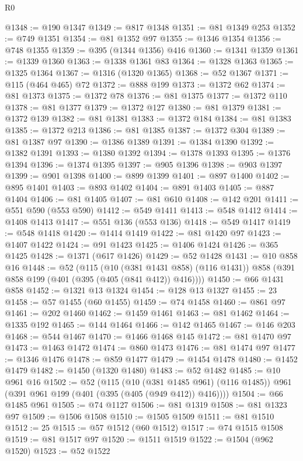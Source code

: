 \begin{lexlean}{R0}
\begin{coremodule}
@1348 := @190 @1347
@1349 := @817 @1348
@1351 := @81 @1349 @253
@1352 := @749 @1351
@1354 := @81 @1352 @97
@1355 := @1346 @1354
@1356 := @748 @1355
@1359 := @395 (@1344 @1356) @416
@1360 := @1341 @1359
@1361 := @1339 @1360
@1363 := @1338 @1361 @83
@1364 := @1328 @1363
@1365 := @1325 @1364
@1367 := @1316 (@1320 @1365)
@1368 := @52 @1367
@1371 := @115 (@464 @465) @72
@1372 := @888 @199
@1373 := @1372 @62
@1374 := @81 @1373
@1375 := @1372 @78
@1376 := @81 @1375
@1377 := @1372 @110
@1378 := @81 @1377
@1379 := @1372 @127
@1380 := @81 @1379
@1381 := @1372 @139
@1382 := @81 @1381
@1383 := @1372 @184
@1384 := @81 @1383
@1385 := @1372 @213
@1386 := @81 @1385
@1387 := @1372 @304
@1389 := @81 @1387 @97
@1390 := @1386 @1389
@1391 := @1384 @1390
@1392 := @1382 @1391
@1393 := @1380 @1392
@1394 := @1378 @1393
@1395 := @1376 @1394
@1396 := @1374 @1395
@1397 := @905 @1396
@1398 := @903 @1397
@1399 := @901 @1398
@1400 := @899 @1399
@1401 := @897 @1400
@1402 := @895 @1401
@1403 := @893 @1402
@1404 := @891 @1403
@1405 := @887 @1404
@1406 := @81 @1405
@1407 := @81 @610
@1408 := @142 @201
@1411 := @551 @590 (@553 @590)
@1412 := @549 @1411
@1413 := @548 @1412
@1414 := @1408 @1413
@1417 := @551 @136 (@553 @136)
@1418 := @549 @1417
@1419 := @548 @1418
@1420 := @1414 @1419
@1422 := @81 @1420 @97
@1423 := @1407 @1422
@1424 := @91 @1423
@1425 := @1406 @1424
@1426 := @365 @1425
@1428 := @1371 (@617 @1426)
@1429 := @52 @1428
@1431 := @10 @858 @16
@1448 := @52
    (@115
      (@10 (@381 @1431 @858) (@116 @1431))
      @858
      (@391 @858 @199 (@401 (@395 (@405 (@841 @412)) @416))))
@1450 := @66 @1431 @858
@1452 := @1321 @13 @1324
@1454 := @128 @13 @1327
@1455 := 23
@1458 := @57 @1455 (@60 @1455)
@1459 := @74 @1458
@1460 := @861 @97
@1461 := @202 @1460
@1462 := @1459 @1461
@1463 := @81 @1462
@1464 := @1335 @192
@1465 := @144 @1464
@1466 := @142 @1465
@1467 := @146 @203
@1468 := @544 @1467
@1470 := @1466 @1468 @145
@1472 := @81 @1470 @97
@1473 := @1463 @1472
@1474 := @860 @1473
@1476 := @81 @1474 @97
@1477 := @1346 @1476
@1478 := @859 @1477
@1479 := @1454 @1478
@1480 := @1452 @1479
@1482 := @1450 (@1320 @1480)
@1483 := @52 @1482
@1485 := @10 @961 @16
@1502 := @52
    (@115
      (@10 (@381 @1485 @961) (@116 @1485))
      @961
      (@391 @961 @199 (@401 (@395 (@405 (@949 @412)) @416))))
@1504 := @66 @1485 @961
@1505 := @74 @1127
@1506 := @81 @1319
@1508 := @81 @1323 @97
@1509 := @1506 @1508
@1510 := @1505 @1509
@1511 := @81 @1510
@1512 := 25
@1515 := @57 @1512 (@60 @1512)
@1517 := @74 @1515 @1508
@1519 := @81 @1517 @97
@1520 := @1511 @1519
@1522 := @1504 (@962 @1520)
@1523 := @52 @1522

\end{coremodule}
\end{lexlean}
